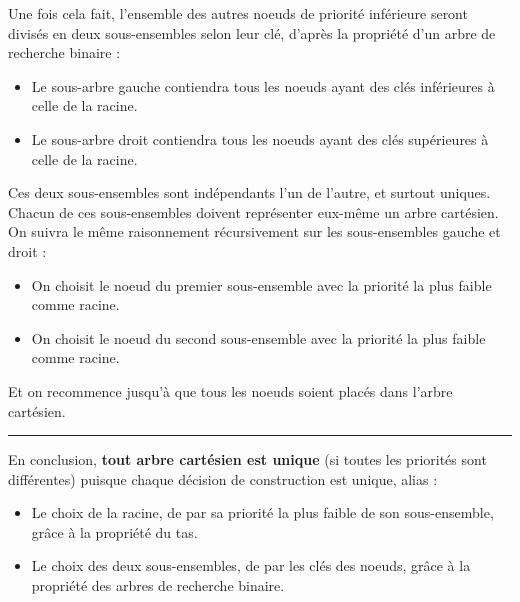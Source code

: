 \documentclass[a4paper,12pt]{report}
\begin{document}
\begin{tcolorbox}[colback=gray!10, colframe=blue!30, coltitle=black, title=Réponse à la 1.a - 2/2]

    Une fois cela fait, l'ensemble des autres noeuds de priorité inférieure seront divisés en deux sous-ensembles selon leur clé, d'après la propriété d'un arbre de recherche binaire :\\[-0.4cm]
    \begin{itemize}
        \item Le sous-arbre gauche contiendra tous les noeuds ayant des clés inférieures à celle de la racine.
        \item Le sous-arbre droit contiendra tous les noeuds ayant des clés supérieures à celle de la racine.
    \end{itemize}

    \vspace{0.5cm}

    Ces deux sous-ensembles sont indépendants l'un de l'autre, et surtout uniques. Chacun de ces sous-ensembles doivent représenter eux-même un arbre cartésien.\\

    On suivra le même raisonnement récursivement sur les sous-ensembles gauche et droit :\\[-0.4cm]
    \begin{itemize}
        \item On choisit le noeud du premier sous-ensemble avec la priorité la plus faible comme racine.
        \item On choisit le noeud du second sous-ensemble avec la priorité la plus faible comme racine.
    \end{itemize}

    \vspace{0.5cm}

    Et on recommence jusqu'à que tous les noeuds soient placés dans l'arbre cartésien.

    \vspace{0.5cm}
    \hrule
    \vspace{0.5cm}

    En conclusion, \textbf{tout arbre cartésien est unique} (si toutes les priorités sont différentes) puisque chaque décision de construction est unique, alias :\\[-0.4cm]
    \begin{itemize}
        \item Le choix de la racine, de par sa priorité la plus faible de son sous-ensemble, grâce à la propriété du tas.
        \item Le choix des deux sous-ensembles, de par les clés des noeuds, grâce à la propriété des arbres de recherche binaire. 
    \end{itemize}

\end{tcolorbox}
\end{document}
